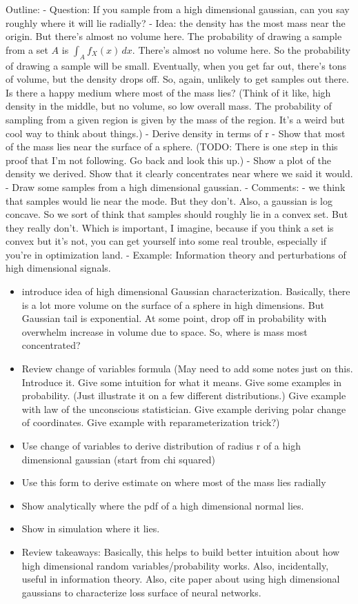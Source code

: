 \documentclass{book}
\newcommand{\dx}{\, dx}
\begin{document}
Outline:
- Question: If you sample from a high dimensional gaussian, can you say roughly where it will lie radially?
- Idea: the density has the most mass near the origin. But there's almost no volume here. The probability of drawing a sample from a set $A$ is $\int_A f_X(x)\dx$. There's almost no volume here. So the probability of drawing a sample will be small. Eventually, when you get far out, there's tons of volume, but the density drops off. So, again, unlikely to get samples out there. Is there a happy medium where most of the mass lies? (Think of it like, high density in the middle, but no volume, so low overall mass. The probability of sampling from a given region is given by the mass of the region. It's a weird but cool way to think about things.) 
- Derive density in terms of r
- Show that most of the mass lies near the surface of a sphere. (TODO: There is one step in this proof that I'm not following. Go back and look this up.) 
- Show a plot of the density we derived. Show that it clearly concentrates near where we said it would. 
- Draw some samples from a high dimensional gaussian.  
- Comments:
  - we think that samples would lie near the mode. But they don't. Also, a gaussian is log concave. So we sort of think that samples should roughly lie in a convex set. But they really don't. Which is important, I imagine, because if you think a set is convex but it's not, you can get yourself into some real trouble, especially if you're in optimization land. 
  - Example: Information theory and perturbations of high dimensional signals. 

\begin{itemize}
  \item introduce idea of high dimensional Gaussian characterization. Basically, there is a lot more volume on the surface of a sphere in high dimensions. But Gaussian tail is exponential. At some point, drop off in probability with overwhelm increase in volume due to space. So, where is mass most concentrated?
  \item Review change of variables formula (May need to add some notes just on this. Introduce it. Give some intuition for what it means. Give some examples in probability. (Just illustrate it on a few different distributions.) Give example with law of the unconscious statistician. Give example deriving polar change of coordinates. Give example with reparameterization trick?) 
  \item Use change of variables to derive distribution of radius r of a high dimensional gaussian (start from chi squared)
  \item Use this form to derive estimate on where most of the mass lies radially
  \item Show analytically where the pdf of a high dimensional normal lies. 
  \item Show in simulation where it lies. 
  \item Review takeaways: Basically, this helps to build better intuition about how high dimensional random variables/probability works. Also, incidentally, useful in information theory. Also, cite paper about using high dimensional gaussians to characterize loss surface of neural networks. 
\end{itemize}
\end{document}
